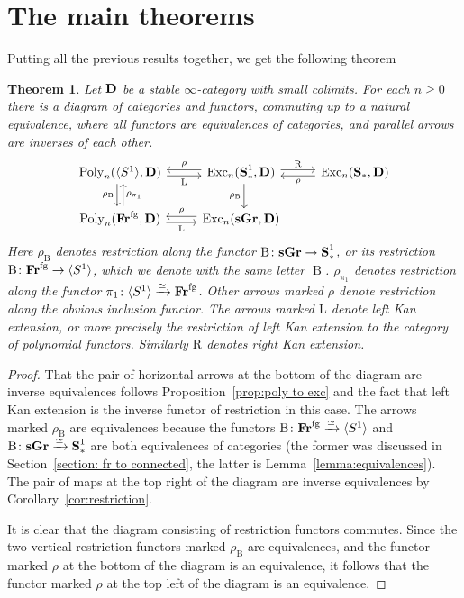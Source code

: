 \documentclass[psamsfonts]{amsart}
\theoremstyle{plain}
\newtheorem{thm}{Theorem}[section]
\theoremstyle{definition}
\theoremstyle{remark}
\newcommand{\catname}[1]{{\normalfont\textbf{#1}}}
\newcommand{\circles}{\langle S^1 \rangle}
\newcommand{\spaces}{\catname{S}_*}
\newcommand{\connected}{\spaces^{1}}
\newcommand{\fr}{\allfr^{\mathrm{fg}}}
\newcommand{\allfr}{\catname{Fr}}
\newcommand{\sgr}{\catname{sGr}}
\newcommand{\classifying}{\operatorname{B}}
\newcommand{\lkan}{\mathrm{L}}
\newcommand{\rkan}{\mathrm{R}}
\DeclareMathOperator{\poly}{Poly}
\DeclareMathOperator{\exc}{Exc}
\begin{document}
\section{The main theorems}\label{section:main theorems}
Putting all the previous results together, we get the following theorem
\begin{thm}\label{theorem:main general}
Let $\catname{D}$ be a stable $\infty$-category with small colimits. For each $n\ge 0$ there is a diagram of categories and functors, commuting up to a natural equivalence, where all functors are equivalences of categories, and parallel arrows are inverses of each other. 
\[
\begin{tikzcd}
	{\poly_n(\circles, \catname{D})} & {\exc_n(\connected, \catname{D})} & {\exc_n(\spaces, \catname{D})} \\
	{\poly_n(\fr, \catname{D})} & {\exc_n(\sgr, \catname{D})}
	\arrow["\lkan"', shift right, from=1-1, to=1-2]
	\arrow["{\rho_{\classifying}}"', shift right, from=1-1, to=2-1]
	\arrow["\rho"', shift right, from=1-2, to=1-1]
	\arrow["\rkan", shift left, from=1-2, to=1-3]
	\arrow["{\rho_{\classifying}}"', shift left, from=1-2, to=2-2]
	\arrow["\rho", shift left, from=1-3, to=1-2]
	\arrow["{\rho_{\pi_1}}"', shift right, from=2-1, to=1-1]
	\arrow["\lkan"', shift right, from=2-1, to=2-2]
	\arrow["\rho"', shift right, from=2-2, to=2-1]
	\arrow[draw=none, from=2-2, to=2-1]
\end{tikzcd}
\]
Here $\rho_{\classifying}$ denotes restriction along the functor $\classifying\colon \sgr\to \connected$, or its restriction $\classifying\colon \fr\to \circles$, which we denote with the same letter $\classifying$. $\rho_{\pi_1}$ denotes restriction along the functor $\pi_1\colon \circles \xrightarrow{\simeq} \fr$. Other arrows marked $\rho$ denote restriction along the obvious inclusion functor. The arrows marked $\lkan$ denote left Kan extension, or more precisely the restriction of left Kan extension to the category of polynomial functors. Similarly $\rkan$ denotes right Kan extension.
\end{thm}
\begin{proof}
That the pair of horizontal arrows at the bottom of the diagram are inverse equivalences follows Proposition~\ref{prop:poly to exc} and the fact that left Kan extension is the inverse functor of restriction in this case. The arrows marked $\rho_{\classifying}$ are equivalences because the functors $\classifying \colon \fr \xrightarrow{\simeq} \circles$ and $\classifying\colon \sgr\xrightarrow{\simeq} \connected$ are both equivalences of categories (the former was discussed in Section~\ref{section: fr to connected}, the latter is Lemma~\ref{lemma:equivalences}). The pair of maps at the top right of the diagram are inverse equivalences by Corollary~\ref{cor:restriction}.

It is clear that the diagram consisting of restriction functors commutes. Since the two vertical restriction functors marked $\rho_{\classifying}$ are equivalences, and the functor marked $\rho$ at the bottom of the diagram is an equivalence, it follows that the functor marked $\rho$ at the top left of the diagram is an equivalence. 
\end{proof}
\end{document}
